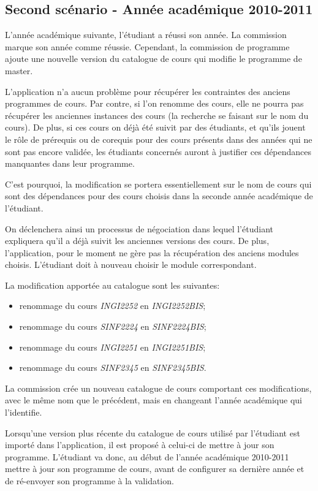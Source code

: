 \subsection{Second scénario - Année académique 2010-2011}
L'année académique suivante, l'étudiant a réussi son année. La commission marque son année comme réussie. Cependant, la commission de programme ajoute une nouvelle version du catalogue de cours qui modifie le programme de master.

L'application n'a aucun problème pour récupérer les contraintes des anciens programmes de cours. Par contre, si l'on renomme des cours, elle ne pourra pas récupérer les anciennes instances des cours (la recherche se faisant sur le nom du cours). De plus, si ces cours on déjà été suivit par des étudiants, et qu'ils jouent le rôle de prérequis ou de corequis pour des cours présents dans des années qui ne sont pas encore validée, les étudiants concernés auront à justifier ces dépendances manquantes dans leur programme. 

C'est pourquoi, la modification se portera essentiellement sur le nom de cours qui sont des dépendances pour des cours choisis dans la seconde année académique de l'étudiant.


On déclenchera ainsi un processus de négociation dans lequel l'étudiant expliquera qu'il a déjà suivit les anciennes versions des cours. De plus, l'application, pour le moment ne gère pas la récupération des anciens modules choisis. L'étudiant doit à nouveau choisir le module correspondant. 

La modification apportée au catalogue sont les suivantes:
\begin{itemize}
\item renommage du cours \textit{INGI2252} en \textit{INGI2252BIS};
\item renommage du cours \textit{SINF2224} en \textit{SINF2224BIS};
\item renommage du cours \textit{INGI2251} en \textit{INGI2251BIS};
\item renommage du cours \textit{SINF2345} en \textit{SINF2345BIS}.
\end{itemize}

La commission crée un nouveau catalogue de cours comportant ces modifications, avec le même nom que le précédent, mais en changeant l'année académique qui l'identifie. 

Lorsqu'une version plus récente du catalogue de cours utilisé par l'étudiant est importé dans l'application, il est proposé à celui-ci de mettre à jour son programme. L'étudiant va donc, au début de l'année académique 2010-2011 mettre à jour son programme de cours, avant de configurer sa dernière année et de ré-envoyer son programme à la validation.

